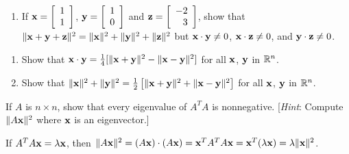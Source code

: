 \begin{multicols}{2}
\begin{ex}
\begin{enumerate}[label={\alph*.}]
\item If $\textbf{x} = 
\left[ \begin{array}{r}
1 \\
1
\end{array} \right]
$, $\textbf{y} = 
\left[ \begin{array}{r}
1 \\
0
\end{array} \right]
$ and $\textbf{z} = 
\left[ \begin{array}{r}
-2 \\
3
\end{array} \right]$, show that $\|\textbf{x} + \textbf{y} + \textbf{z}\|^{2} = \|\textbf{x}\|^{2} + \|\textbf{y}\|^{2} + \|\textbf{z}\|^{2}$ but \newline $\textbf{x} \cdot \textbf{y} \neq 0$, $\textbf{x} \cdot \textbf{z} \neq 0$, and $\textbf{y} \cdot \textbf{z} \neq 0$.

\end{enumerate}
\end{ex}

\begin{ex}\label{ex:5_3_14}
\begin{enumerate}[label={\alph*.}]
\item Show that $\textbf{x} \cdot \textbf{y} = \tfrac{1}{4}[\|\textbf{x} + \textbf{y}\|^{2} - \|\textbf{x} - \textbf{y}\|^{2}]$ for all $\textbf{x}$, $\textbf{y}$ in $\mathbb{R}^n$.

\item Show that $\|\textbf{x}\|^{2} + \|\textbf{y}\|^{2} = \tfrac{1}{2}\left[ \|\textbf{x} + \textbf{y}\|^{2} + \|\textbf{x} - \textbf{y}\|^{2}\right]$ for all $\textbf{x}$, $\textbf{y}$ in $\mathbb{R}^n$.

\end{enumerate}
\end{ex}

\begin{ex}
If $A$ is $n \times n$, show that every eigenvalue of $A^{T}A$ is
nonnegative. [\textit{Hint}: Compute $\| A\textbf{x}\|^{2}$ where $\textbf{x}$ is an eigenvector.]

\begin{sol}
If $A^{T}A\textbf{x} = \lambda\textbf{x}$, then $\| A\textbf{x}\|^{2} = (A\textbf{x}) \cdot (A\textbf{x}) = \textbf{x}^{T}A^{T}A\textbf{x} = \textbf{x}^{T}(\lambda\textbf{x}) = \lambda\|\textbf{x}\|^{2}$.
\end{sol}
\end{ex}


\end{multicols}
